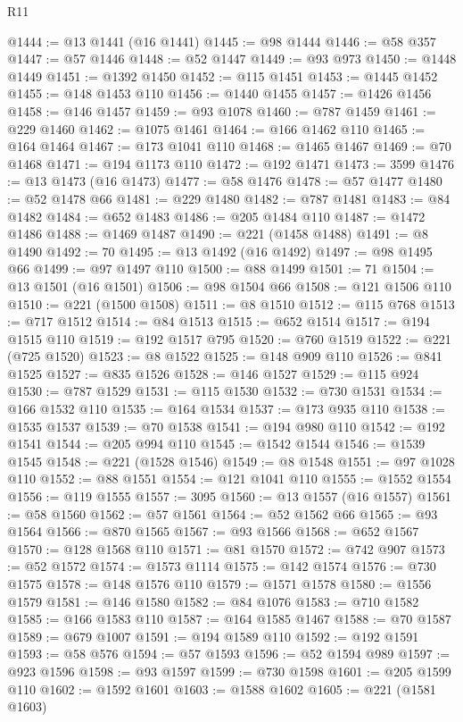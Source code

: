 \begin{lexlean}{R11}
\begin{coremodule}
@1444 := @13 @1441 (@16 @1441)
@1445 := @98 @1444
@1446 := @58 @357
@1447 := @57 @1446
@1448 := @52 @1447
@1449 := @93 @973
@1450 := @1448 @1449
@1451 := @1392 @1450
@1452 := @115 @1451
@1453 := @1445 @1452
@1455 := @148 @1453 @110
@1456 := @1440 @1455
@1457 := @1426 @1456
@1458 := @146 @1457
@1459 := @93 @1078
@1460 := @787 @1459
@1461 := @229 @1460
@1462 := @1075 @1461
@1464 := @166 @1462 @110
@1465 := @164 @1464
@1467 := @173 @1041 @110
@1468 := @1465 @1467
@1469 := @70 @1468
@1471 := @194 @1173 @110
@1472 := @192 @1471
@1473 := 3599
@1476 := @13 @1473 (@16 @1473)
@1477 := @58 @1476
@1478 := @57 @1477
@1480 := @52 @1478 @66
@1481 := @229 @1480
@1482 := @787 @1481
@1483 := @84 @1482
@1484 := @652 @1483
@1486 := @205 @1484 @110
@1487 := @1472 @1486
@1488 := @1469 @1487
@1490 := @221 (@1458 @1488)
@1491 := @8 @1490
@1492 := 70
@1495 := @13 @1492 (@16 @1492)
@1497 := @98 @1495 @66
@1499 := @97 @1497 @110
@1500 := @88 @1499
@1501 := 71
@1504 := @13 @1501 (@16 @1501)
@1506 := @98 @1504 @66
@1508 := @121 @1506 @110
@1510 := @221 (@1500 @1508)
@1511 := @8 @1510
@1512 := @115 @768
@1513 := @717 @1512
@1514 := @84 @1513
@1515 := @652 @1514
@1517 := @194 @1515 @110
@1519 := @192 @1517 @795
@1520 := @760 @1519
@1522 := @221 (@725 @1520)
@1523 := @8 @1522
@1525 := @148 @909 @110
@1526 := @841 @1525
@1527 := @835 @1526
@1528 := @146 @1527
@1529 := @115 @924
@1530 := @787 @1529
@1531 := @115 @1530
@1532 := @730 @1531
@1534 := @166 @1532 @110
@1535 := @164 @1534
@1537 := @173 @935 @110
@1538 := @1535 @1537
@1539 := @70 @1538
@1541 := @194 @980 @110
@1542 := @192 @1541
@1544 := @205 @994 @110
@1545 := @1542 @1544
@1546 := @1539 @1545
@1548 := @221 (@1528 @1546)
@1549 := @8 @1548
@1551 := @97 @1028 @110
@1552 := @88 @1551
@1554 := @121 @1041 @110
@1555 := @1552 @1554
@1556 := @119 @1555
@1557 := 3095
@1560 := @13 @1557 (@16 @1557)
@1561 := @58 @1560
@1562 := @57 @1561
@1564 := @52 @1562 @66
@1565 := @93 @1564
@1566 := @870 @1565
@1567 := @93 @1566
@1568 := @652 @1567
@1570 := @128 @1568 @110
@1571 := @81 @1570
@1572 := @742 @907
@1573 := @52 @1572
@1574 := @1573 @1114
@1575 := @142 @1574
@1576 := @730 @1575
@1578 := @148 @1576 @110
@1579 := @1571 @1578
@1580 := @1556 @1579
@1581 := @146 @1580
@1582 := @84 @1076
@1583 := @710 @1582
@1585 := @166 @1583 @110
@1587 := @164 @1585 @1467
@1588 := @70 @1587
@1589 := @679 @1007
@1591 := @194 @1589 @110
@1592 := @192 @1591
@1593 := @58 @576
@1594 := @57 @1593
@1596 := @52 @1594 @989
@1597 := @923 @1596
@1598 := @93 @1597
@1599 := @730 @1598
@1601 := @205 @1599 @110
@1602 := @1592 @1601
@1603 := @1588 @1602
@1605 := @221 (@1581 @1603)

\end{coremodule}
\end{lexlean}

